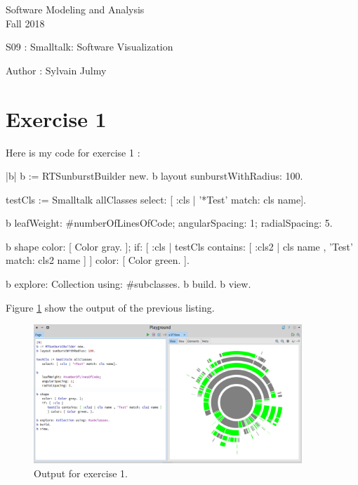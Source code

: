 \documentclass[a4paper,11pt]{report}
\date{\today}
\begin{document}
\begin{center}
\Large{
    Software Modeling and Analysis \\
    Fall 2018
  }
  
  \noindent\makebox[\linewidth]{\rule{\linewidth}{0.4pt}}
  S09 : Smalltalk: Software Visualization

  \vspace*{1.4cm}

  Author : Sylvain Julmy
  \noindent\makebox[\linewidth]{\rule{\linewidth}{0.4pt}}
\end{center}

\section*{Exercise 1}

Here is my code for exercise 1 :

\begin{smalltalkcode}
|b|
b := RTSunburstBuilder new.
b layout sunburstWithRadius: 100.

testCls := Smalltalk allClasses select: [ :cls | '*Test' match: cls name].

b leafWeight: #numberOfLinesOfCode;
  angularSpacing: 1;
  radialSpacing: 5.

b shape
  color: [ Color gray. ];
  if: [ :cls | 
    testCls contains: [ :cls2 | cls name , 'Test' match: cls2 name ] 
  ] color: [ Color green. ].

b explore: Collection using: #subclasses.
b build.
b view.
\end{smalltalkcode}

Figure \ref{fig:ex1} show the output of the previous listing.

\begin{figure}[h]
  \centering
  \includegraphics[width=0.9\textwidth]{ex1.png}
  \caption{Output for exercise 1.}
  \label{fig:ex1}
\end{figure}
\end{document}
